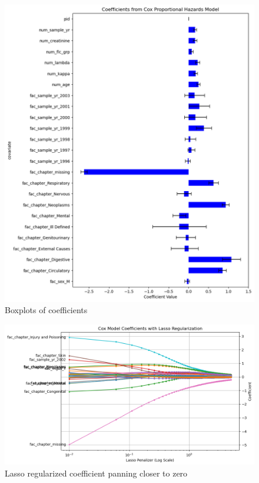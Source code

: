 \begin{figure}[h]
    \centering
    \includegraphics[width=\linewidth]{Figures/SURV/cox_cov.png}
    \caption{Boxplots of coefficients}
    \label{fig:your_label}
\end{figure}

\begin{figure}[h]
    \centering
    \includegraphics[width=\linewidth]{Figures/SURV/lasso_reg.png}
    \caption{Lasso regularized coefficient panning closer to zero}
    \label{fig:your_label}
\end{figure}

